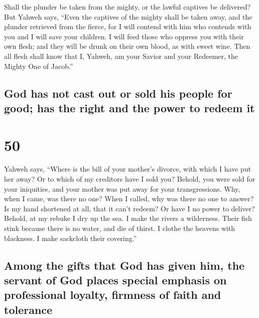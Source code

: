  Shall the plunder be taken from the mighty, or the
lawful captives be delivered?  But Yahweh says, ``Even
the captives of the mighty shall be taken away, and the plunder
retrieved from the fierce, for I will contend with him who contends with
you and I will save your children.  I will feed those who
oppress you with their own flesh; and they will be drunk on their own
blood, as with sweet wine. Then all flesh shall know that I, Yahweh, am
your Savior and your Redeemer, the Mighty One of Jacob.''

\hypertarget{god-has-not-cast-out-or-sold-his-people-for-good-has-the-right-and-the-power-to-redeem-it}{%
\subsection{God has not cast out or sold his people for good; has the
right and the power to redeem
it}\label{god-has-not-cast-out-or-sold-his-people-for-good-has-the-right-and-the-power-to-redeem-it}}

\hypertarget{section-49}{%
\section{50}\label{section-49}}

 Yahweh says, ``Where is the bill of your mother's
divorce, with which I have put her away? Or to which of my creditors
have I sold you? Behold, you were sold for your iniquities, and your
mother was put away for your transgressions.  Why, when I
came, was there no one? When I called, why was there no one to answer?
Is my hand shortened at all, that it can't redeem? Or have I no power to
deliver? Behold, at my rebuke I dry up the sea. I make the rivers a
wilderness. Their fish stink because there is no water, and die of
thirst.  I clothe the heavens with blackness. I make
sackcloth their covering.''

\hypertarget{among-the-gifts-that-god-has-given-him-the-servant-of-god-places-special-emphasis-on-professional-loyalty-firmness-of-faith-and-tolerance}{%
\subsection{Among the gifts that God has given him, the servant of God
places special emphasis on professional loyalty, firmness of faith and
tolerance}\label{among-the-gifts-that-god-has-given-him-the-servant-of-god-places-special-emphasis-on-professional-loyalty-firmness-of-faith-and-tolerance}}

